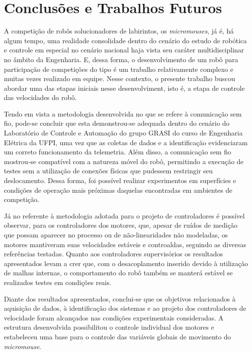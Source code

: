 \chapter{Conclusões e Trabalhos Futuros} \label{cap:conclusoes-e-trabalhos-futuros}

    A competição de robôs solucionadores de labirintos, os \textit{micromouses}, já é, há algum tempo, uma realidade consolidade dentro do cenário do estudo de robótica e controle em especial no cenário nacional haja vista seu caráter multidisciplinar no âmbito da Engenharia. E, dessa forma, o desenvolvimento de um robô para participação de competições do tipo é um trabalho relativamente complexo e muitas vezes realizado em equipe. Nesse contexto, o presente trabalho buscou abordar uma das etapas iniciais nesse desenvolviment, isto é, a etapa de controle das velocidades do robô.

    Tendo em vista a metodologia desenvolvida no que se refere à comunicação sem fio, pode-se concluir que esta demonstrou-se adequada dentro do cenário do Laboratório de Controle e Automação do grupo \gls{GRASI} do curso de Engenharia Elétrica da \gls{UFPI}, uma vez que as coletas de dados e a identificação evidenciaram um correto funcionamento da telemetria. Além disso, a comunicação sem fio mostrou-se compatível com a natureza móvel do robô, permitindo a execução de testes sem a utilização de conexões físicas que pudessem restringir seu deslocamento. Dessa forma, foi possível realizar experimentos em superfícies e condições de operação mais próximas daquelas encontradas em ambientes de competição.

    Já no referente à metodologia adotada para o projeto de controladores é possível observar, para os controladores dos motores, que, apesar de ruídos de medição que possam aparecer no processo ou de não-linearidades não modeladas, os motores mantiveram suas velocidades estáveis e controaldas, seguindo as diversas referências testadas. Quanto aos controladores supervisórios os resultados apresentados levam a crer que, com o desacoplamento inserido devido à utilização de malhas internas, o comportamento do robô também se manterá estável se realizados testes em condições reais.


    Diante dos resultados apresentados, conclui-se que os objetivos relacionados à aquisição de dados, à identificação dos sistemas e ao projeto dos controladores de velocidade foram alcançados nas condições experimentais consideradas. A estrutura desenvolvida possibilitou o controle individual dos motores e estabeleceu uma base para o controle das variáveis globais de movimento do \textit{micromouse}. 
    
